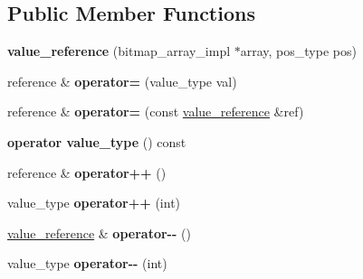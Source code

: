 \subsection*{Public Member Functions}
\begin{DoxyCompactItemize}
\item 
\mbox{\label{classdialog_1_1value__reference_abbb44cdf87a3db555ce8b188b2fcb8e0}} 
{\bfseries value\+\_\+reference} (bitmap\+\_\+array\+\_\+impl $\ast$array, pos\+\_\+type pos)
\item 
\mbox{\label{classdialog_1_1value__reference_a7488d0900b7ab689ebd6937150efe25a}} 
reference \& {\bfseries operator=} (value\+\_\+type val)
\item 
\mbox{\label{classdialog_1_1value__reference_a3318c3d155dff7ee3851d830ff162696}} 
reference \& {\bfseries operator=} (const \hyperlink{classdialog_1_1value__reference}{value\+\_\+reference} \&ref)
\item 
\mbox{\label{classdialog_1_1value__reference_a826f401d79fddb19f503bee349edf9f8}} 
{\bfseries operator value\+\_\+type} () const
\item 
\mbox{\label{classdialog_1_1value__reference_a2ffaf7ec5afae899bb3cde400f369d0c}} 
reference \& {\bfseries operator++} ()
\item 
\mbox{\label{classdialog_1_1value__reference_aaa96d39c1a9f9050a7559a1c0796841f}} 
value\+\_\+type {\bfseries operator++} (int)
\item 
\mbox{\label{classdialog_1_1value__reference_a6e6fb2e13bdf48eed4c94432526c8952}} 
\hyperlink{classdialog_1_1value__reference}{value\+\_\+reference} \& {\bfseries operator-\/-\/} ()
\item 
\mbox{\label{classdialog_1_1value__reference_ad46de993f3ce02206393fd2eea4eed8c}} 
value\+\_\+type {\bfseries operator-\/-\/} (int)
\item 
\mbox{\label{classdialog_1_1value__reference_ac6e18a0b9e9c3e483b2abe27af94dc74}} 

\end{DoxyCompactItemize}
